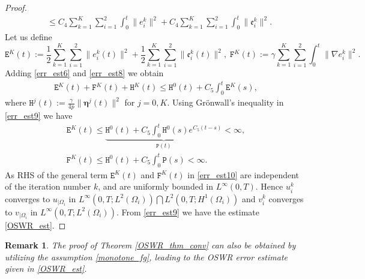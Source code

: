 \documentclass[11pt]{article}
\newtheorem{remark}[theorem]{Remark}
\begin{document}
\begin{proof}
\begin{equation}
\begin{aligned}
& \leq C_4 \sum_{k=1}^K\sum_{i=1}^2\int_0^t\parallel e_i^{k}\parallel^2 + C_4 \sum_{k=1}^K\sum_{i=1}^2\int_0^t\parallel \mathfrak{e}_i^{k}\parallel^2.
\end{aligned}
\end{equation} 
Let us define 
\begin{equation}
\mathtt{E}^{K}(t):= \frac{1}{2}\sum_{k=1}^K\sum_{i=1}^2\parallel {e}_i^{k}(t)\parallel^2 + \frac{1}{2}\sum_{k=1}^K\sum_{i=1}^2\parallel \mathfrak{e}_i^{k}(t)\parallel^2, \; \mathtt{F}^{K}(t):= \gamma\sum_{k=1}^K\sum_{i=1}^2\int_0^t \parallel\nabla e_i^{k} \parallel^2.
\end{equation}
Adding \eqref{err_est6} and \eqref{err_est8} we obtain 
\begin{equation}\label{err_est9}
\begin{aligned}
\mathtt{E}^{K}(t)+ \mathtt{F}^{K}(t) +\mathtt{H}^{K}(t)
 \leq \mathtt{H}^{0}(t)+ C_5\int_0^t\mathtt{E}^{K}(s),
\end{aligned}
\end{equation} 
where $\mathtt{H}^{j}(t):=\frac{\gamma}{4p} \parallel\boldsymbol{\eta}^{j}(t)\parallel^2$ for $j=0, K$. 
Using Gr\"{o}nwall's inequality in \eqref{err_est9} we have
\begin{equation}\label{err_est10}
\begin{aligned}
\mathtt{E}^{K}(t) \leq \underbrace{\mathtt{H}^{0}(t) + C_5\int_0^t \mathtt{H}^{0}(s) e^{C_5 (t-s)}}_{\mathtt{P}(t)} <\infty, \\
\mathtt{F}^{K}(t) \leq \mathtt{H}^{0}(t) +C_5\int_0^t \mathtt{P}(s)<\infty.
\end{aligned}
\end{equation}
As RHS of the general term $\mathtt{E}^{K}(t)$ and $\mathtt{F}^{K}(t)$ in \eqref{err_est10} are independent of the iteration number $k$, %
and are uniformly bounded in $L^{\infty}(0,T)$. Hence $u_i^{k}$ converges to $u_{|\Omega_i}$ in 
$L^{\infty}(0,T;L^2(\Omega_i))\bigcap L^2(0,T;H^1(\Omega_i))$ and $v_i^{k}$ converges to $v_{|\Omega_i}$ in 
$L^{\infty}(0,T;L^2(\Omega_i))$. From \eqref{err_est9} we have the estimate \eqref{OSWR_est}.
\end{proof}

\begin{remark}
The proof of Theorem \ref{OSWR_thm_conv} can also be obtained by utilizing the assumption \eqref{monotone_fg}, leading to the OSWR error estimate given in \eqref{OSWR_est}.
\end{remark}
\end{document}
